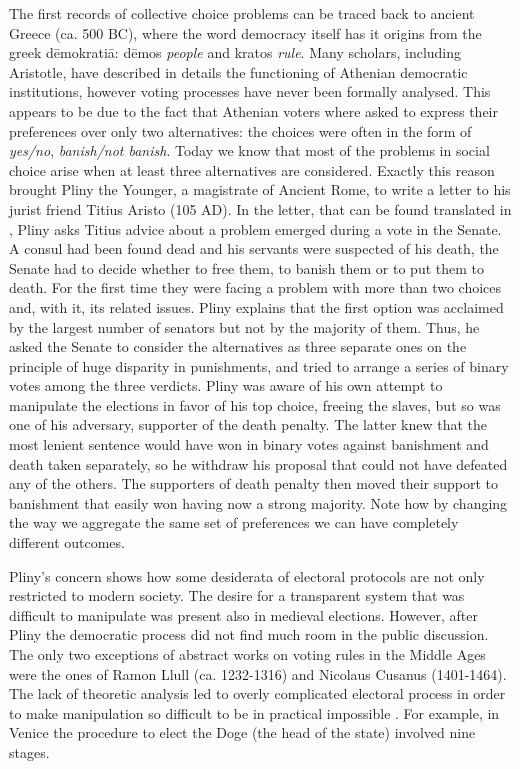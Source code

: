 The first records of collective choice problems can be traced back to ancient Greece (ca. 500 BC), where the word democracy itself has it origins from the greek dēmokratiā: dēmos \textit{people} and kratos \textit{rule}. 
Many scholars, including Aristotle, have described in details the functioning of Athenian democratic institutions, however voting processes have never been formally analysed. This appears to be due to the fact that Athenian voters where asked to express their preferences over only two alternatives: the choices were often in the form of \textit{yes/no}, \textit{banish/not banish}. Today we know that most of the problems in social choice arise when at least three alternatives are considered. Exactly this reason brought Pliny the Younger, a magistrate of Ancient Rome, to write a letter to his jurist friend Titius Aristo (105 AD). In the letter, that can be found translated in \citet[Chapter 2]{McLeanUrken1995}, Pliny asks Titius advice about a problem emerged during a vote in the Senate. A consul had been found dead and his servants were suspected of his death, the Senate had to decide whether to free them, to banish them or to put them to death. For the first time they were facing a problem with more than two choices and, with it, its related issues. Pliny explains that the first option was acclaimed by the largest number of senators but not by the majority of them. Thus, he asked the Senate to consider the alternatives as three separate ones on the principle of huge disparity in punishments, and tried to arrange a series of binary votes among the three verdicts. Pliny was aware of his own attempt to manipulate the elections in favor of his top choice, freeing the slaves, but so was one of his adversary, supporter of the death penalty. The latter knew that the most lenient sentence would have won in binary votes against banishment and death taken separately, so he withdraw his proposal that could not have defeated any of the others. The supporters of death penalty then moved their support to banishment that easily won having now a strong majority. Note how by changing the way we aggregate the same set of preferences we can have completely different outcomes.

Pliny's concern shows how some desiderata of electoral protocols are not only restricted to modern society. The desire for a transparent system that was difficult to manipulate was present also in medieval elections. However, after Pliny the democratic process did not find much room in the public discussion. The only two exceptions of abstract works on voting rules in the Middle Ages were the ones of Ramon Llull (ca. 1232-1316) and Nicolaus Cusanus (1401-1464). The lack of theoretic analysis led to overly complicated electoral process in order to make manipulation so difficult to be in practical impossible \citep{Uckelman2010}. For example, in Venice the procedure to elect the Doge (the head of the state) involved nine stages. 


